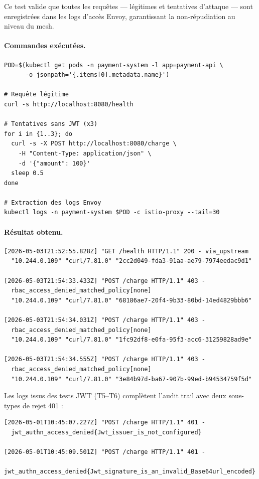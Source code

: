 Ce test valide que toutes les requêtes --- légitimes et tentatives d'attaque ---
sont enregistrées dans les logs d'accès Envoy, garantissant la non-répudiation
au niveau du mesh.

\paragraph{Commandes exécutées.}
\begin{verbatim}
POD=$(kubectl get pods -n payment-system -l app=payment-api \
      -o jsonpath='{.items[0].metadata.name}')

# Requête légitime
curl -s http://localhost:8080/health

# Tentatives sans JWT (x3)
for i in {1..3}; do
  curl -s -X POST http://localhost:8080/charge \
    -H "Content-Type: application/json" \
    -d '{"amount": 100}'
  sleep 0.5
done

# Extraction des logs Envoy
kubectl logs -n payment-system $POD -c istio-proxy --tail=30
\end{verbatim}

\paragraph{Résultat obtenu.}
\begin{verbatim}
[2026-05-03T21:52:55.828Z] "GET /health HTTP/1.1" 200 - via_upstream
  "10.244.0.109" "curl/7.81.0" "2cc2d049-fda3-91aa-ae79-7974eedac9d1"

[2026-05-03T21:54:33.433Z] "POST /charge HTTP/1.1" 403 -
  rbac_access_denied_matched_policy[none]
  "10.244.0.109" "curl/7.81.0" "68186ae7-20f4-9b33-80bd-14ed4829bbb6"

[2026-05-03T21:54:34.031Z] "POST /charge HTTP/1.1" 403 -
  rbac_access_denied_matched_policy[none]
  "10.244.0.109" "curl/7.81.0" "1fc92df8-e0fa-95f3-acc6-31259828ad9e"

[2026-05-03T21:54:34.555Z] "POST /charge HTTP/1.1" 403 -
  rbac_access_denied_matched_policy[none]
  "10.244.0.109" "curl/7.81.0" "3e84b97d-ba67-907b-99ed-b94534759f5d"
\end{verbatim}

Les logs issus des tests JWT (T5--T6) complètent l'audit trail avec deux
sous-types de rejet 401 :

\begin{verbatim}
[2026-05-01T10:45:07.227Z] "POST /charge HTTP/1.1" 401 -
  jwt_authn_access_denied{Jwt_issuer_is_not_configured}

[2026-05-01T10:45:09.501Z] "POST /charge HTTP/1.1" 401 -
  jwt_authn_access_denied{Jwt_signature_is_an_invalid_Base64url_encoded}
\end{verbatim}

